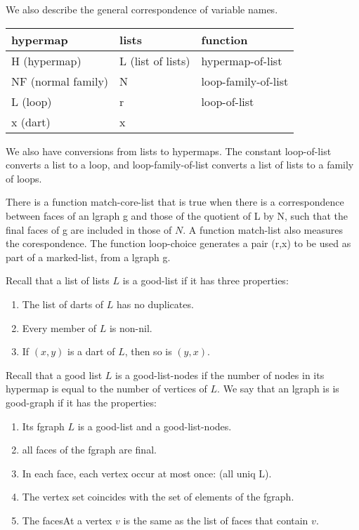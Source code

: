 \bigskip
We also describe the general correspondence of variable names.

\begin{tabular}{l l l}
\hline
{\bf hypermap} & {\bf lists} & {\bf function}\\ \hline
H (hypermap) & L (list of lists) & hypermap-of-list\\
NF (normal family) & N & loop-family-of-list \\
L (loop) & r & loop-of-list \\
x (dart) & x \\
\hline
\end{tabular}

\bigskip
We also have conversions from lists to hypermaps.  The constant loop-of-list converts a list to a loop,
and loop-family-of-list converts a list of lists to a family of loops.

There is a function match-core-list that is true when there is a correspondence between
faces of an lgraph g and those of the quotient of L by N, such that the final faces of g are included in those of $N$.
A function match-list also measures the corespondence.  The function loop-choice generates a pair (r,x)
to be used as part of a marked-list, from a lgraph g.






\begin{definition}
Recall that a list of lists $L$ is a good-list if it has three properties:
\begin{enumerate}
\item The list of darts of $L$ has no duplicates.
\item Every member of $L$ is non-nil.
\item If $(x,y)$ is a dart of $L$, then so is $(y,x)$.
\end{enumerate}
Recall that a good list $L$ is a good-list-nodes if 
the number of nodes in its hypermap is equal to the number
of vertices of $L$.
We say that an lgraph is is good-graph if it has the properties:
\begin{enumerate}
\item Its fgraph $L$ is a good-list and a good-list-nodes.
\item all faces of the fgraph are final.
\item In each face, each vertex occur at most once: (all uniq L).
\item The vertex set coincides with the set of elements of the fgraph.
\item The facesAt a vertex $v$ is the same as the list of faces that contain $v$.
\end{enumerate}
\end{definition}

